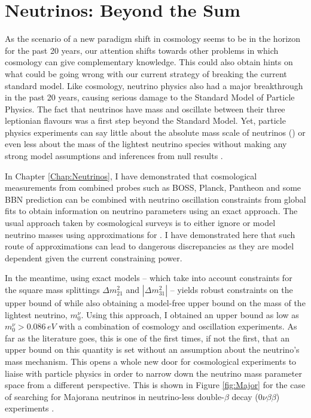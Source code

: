 \section{Neutrinos: Beyond the Sum}
\label{sec:conclusion:sec2}
As the scenario of a new paradigm shift in cosmology seems to be in the horizon for the past 20 years, our attention shifts towards other problems in which cosmology can give complementary knowledge. This could also obtain hints on what could be going wrong with our current strategy of breaking the current standard model. Like cosmology, neutrino physics also had a major breakthrough in the past 20 years, causing serious damage to the Standard Model of Particle Physics. The fact that neutrinos have mass and oscillate between their three leptionian flavours was a first step beyond the Standard Model. Yet, particle physics experiments can say little about the absolute mass scale of neutrinos (\NM) or even less about the mass of the lightest neutrino species without making any strong model assumptions and inferences from null results \citep{2016KamLANDMajorana}.

\qquad In Chapter \ref{Chap:Neutrinos}, I have demonstrated that cosmological measurements from combined probes such as BOSS, Planck, Pantheon and some BBN prediction can be combined with neutrino oscillation constraints from global fits to obtain information on neutrino parameters using an exact approach. The usual approach taken by cosmological surveys is to either ignore or model neutrino masses using approximations for \NM. I have demonstrated here that such route of approximations can lead to dangerous discrepancies as they are model dependent given the current constraining power. 

\qquad In the meantime, using exact models -- which take into account constraints for the square mass splittings $\Delta m_{21}^2$ and $|\Delta m_{31}^2|$ -- yields robust constraints on the upper bound of \NM{} while also obtaining a model-free upper bound on the mass of the lightest neutrino, $m_0^{\nu}$. Using this approach, I obtained an upper bound as low as $m_0^{\nu} > 0.086\, eV$ with a combination of cosmology and oscillation experiments. As far as the literature goes, this is one of the first times, if not the first, that an upper bound on this quantity is set without an assumption about the neutrino's mass mechanism. This opens a whole new door for cosmological experiments to liaise with particle physics in order to narrow down the neutrino mass parameter space from a different perspective. This is shown in Figure \ref{fig:Major} for the case of searching for Majorana neutrinos in neutrino-less double-$\beta$ decay ($0\nu\beta\beta$) experiments \citep{2016DoubleBetaReview}. 


